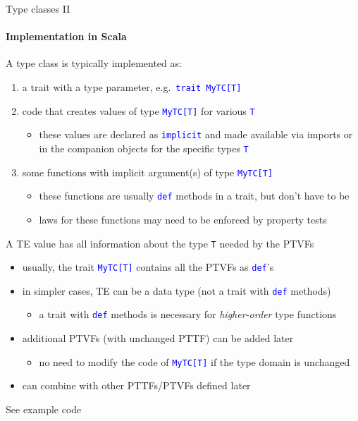 \documentclass[english]{beamer}
\begin{document}
\begin{frame}{Type classes II}


\framesubtitle{Implementation in Scala}

A type class is typically implemented as:
\begin{enumerate}
\item a trait with a type parameter, e.g.\ \texttt{\textcolor{blue}{\footnotesize{}trait
MyTC{[}T{]}}}{\footnotesize \par}
\item code that creates values of type \texttt{\textcolor{blue}{\footnotesize{}MyTC{[}T{]}}}
for various \texttt{\textcolor{blue}{\footnotesize{}T}}{\footnotesize \par}
\begin{itemize}
\item these values are declared as \texttt{\textcolor{blue}{\footnotesize{}implicit}}
and made available via imports or in the companion objects for the
specific types \texttt{\textcolor{blue}{\footnotesize{}T}}{\footnotesize \par}
\end{itemize}
\item some functions with implicit argument(s) of type \texttt{\textcolor{blue}{\footnotesize{}MyTC{[}T{]}}}{\footnotesize \par}
\begin{itemize}
\item these functions are usually \texttt{\textcolor{blue}{\footnotesize{}def}}
methods in a trait, but don't have to be
\item laws for these functions may need to be enforced by property tests
\end{itemize}
\end{enumerate}
A TE value has all information about the type \texttt{\textcolor{blue}{\footnotesize{}T}}
needed by the PTVFs
\begin{itemize}
\item usually, the trait \texttt{\textcolor{blue}{\footnotesize{}MyTC{[}T{]}}}
contains all the PTVFs as \texttt{\textcolor{blue}{\footnotesize{}def}}'s
\item in simpler cases, TE can be a data type (not a trait with \texttt{\textcolor{blue}{\footnotesize{}def}}
methods)
\begin{itemize}
\item a trait with \texttt{\textcolor{blue}{\footnotesize{}def}} methods
is necessary for \emph{higher-order} type functions
\end{itemize}
\item additional PTVFs (with unchanged PTTF) can be added later
\begin{itemize}
\item no need to modify the code of \texttt{\textcolor{blue}{\footnotesize{}MyTC{[}T{]}}}
if the type domain is unchanged
\end{itemize}
\item can combine with other PTTFs/PTVFs defined later
\end{itemize}
See example code
\end{frame}
\end{document}
